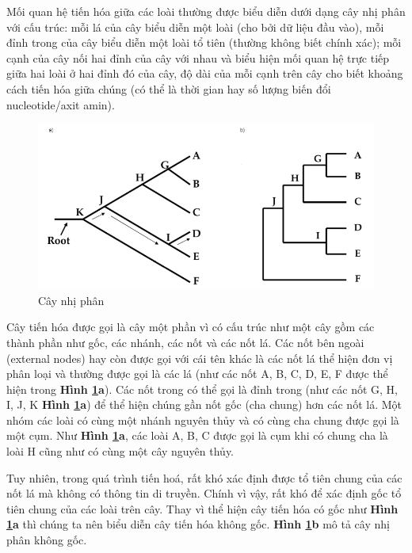 \documentclass[12pt]{report}
\begin{document}
Mối quan hệ tiến hóa giữa các loài thường được biểu diễn dưới dạng cây nhị phân với cấu trúc: mỗi lá của cây biểu diễn một loài (cho bởi dữ liệu đầu vào), mỗi đỉnh trong của cây biểu diễn một loài tổ tiên (thường không biết chính xác); mỗi cạnh của cây nối hai đỉnh của cây với nhau và biểu hiện mối quan hệ trực tiếp giữa hai loài ở hai đỉnh đó của cây, độ dài của mỗi cạnh trên cây cho biết khoảng cách tiến hóa giữa chúng (có thể là thời gian hay số lượng biến đổi nucleotide/axit amin).

\begin{figure}[h]
	\centering
	\includegraphics[scale=0.5]{Image/1.0.png}
	\caption{Cây nhị phân \cite{cia-2}}
	\label{fig:image1.1}
\end{figure}

Cây tiến hóa \cite{cia-2} được gọi là cây một phần vì có cấu trúc như một cây gồm các thành phần như gốc, các nhánh, các nốt và các nốt lá. Các nốt bên ngoài (external nodes) hay còn được gọi với cái tên khác là các nốt lá thể hiện đơn vị phân loại và thường được gọi là các lá (như các nốt A, B, C, D, E, F được thể hiện trong \textbf{Hình \ref{fig:image1.1}a}). Các nốt trong có thể gọi là đỉnh trong (như các nốt G, H, I, J, K  \textbf{Hình \ref{fig:image1.1}a}) để thể hiện chúng gần nốt gốc (cha chung) hơn các nốt lá. Một nhóm các loài có cùng một nhánh nguyên thủy và có cùng cha chung được gọi là một cụm. Như \textbf{Hình \ref{fig:image1.1}a}, các loài A, B, C được gọi là cụm khi có chung cha là loài H cũng như có cùng một cây nguyên thủy. 

 Tuy nhiên, trong quá trình tiến hoá, rất khó xác định được tổ tiên chung của các nốt lá mà không có thông tin di truyền. Chính vì vậy, rất khó để xác định gốc tổ tiên chung của các loài trên cây. Thay vì thể hiện cây tiến hóa có gốc  như \textbf{Hình \ref{fig:image1.1}a} thì chúng ta nên biểu diễn cây tiến hóa không gốc. \textbf{Hình \ref{fig:image1.1}b} mô tả cây nhị phân không gốc.
\end{document}

